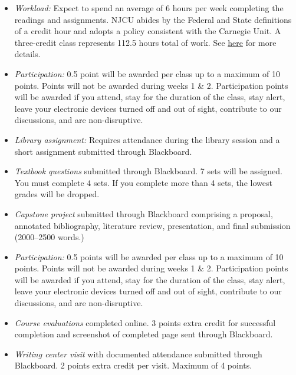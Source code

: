 \documentclass[article,oneside]{memoir}
\begin{document}
\begin{itemize}
\item \textit{Workload:} Expect to spend an average of 6 hours per week completing the readings and assignments. NJCU abides by the Federal and State definitions of a credit hour and adopts a policy consistent with the Carnegie Unit. A three-credit class represents 112.5 hours total of work. See \href{http://scottoconnor.org/resources/Credit.pdf}{here} for more details.


\item \textit{Participation:}  0.5 point will be awarded per class up to a maximum of 10 points. Points will not be awarded during weeks 1 \& 2. Participation points will be awarded if you attend, stay for the duration of the class, stay alert, leave your electronic devices turned off and out of sight, contribute to our discussions, and are non-disruptive. 

\item \textit{Library assignment:} Requires attendance during the library session and a short assignment submitted through Blackboard.

\item \textit{Textbook questions} submitted through Blackboard. 7 sets will be assigned. You must complete 4 sets. If you complete more than 4 sets, the lowest grades will be dropped. 




 
\item \textit{Capstone project} submitted through Blackboard comprising a proposal, annotated bibliography, literature review, presentation, and final submission (2000--2500 words.)

\item \textit{Participation:} 0.5 points will be awarded per class up to a maximum of 10 points. Points will not be awarded during weeks 1 \& 2. Participation points will be awarded if you attend, stay for the duration of the class, stay alert, leave your electronic devices turned off and out of sight, contribute to our discussions, and are non-disruptive.

\item \textit{Course evaluations} completed online. 3 points extra credit for successful completion and screenshot of completed page sent through Blackboard. 

\item \textit{Writing center visit} with documented attendance submitted through Blackboard. 2 points extra credit per visit. Maximum of 4 points.  



\end{itemize}
\end{document}
